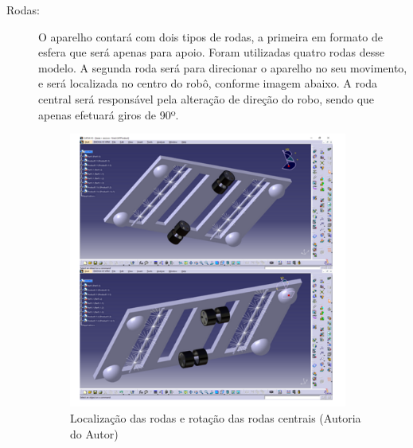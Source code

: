 \begin{description}
\item[Rodas:] O aparelho contará com dois tipos de rodas, a primeira em formato
de esfera que será apenas para apoio. Foram utilizadas quatro rodas desse modelo.
A segunda roda será para direcionar o aparelho no seu movimento, e será localizada
no centro do robô, conforme imagem abaixo. A roda central será responsável pela
alteração de direção do robo, sendo que apenas efetuará giros de  90º.
\par
\begin{figure}[h]
  \centering
  \includegraphics[width=0.9\textwidth]{figures/wheels.png}
  \caption{Localização das rodas e rotação das rodas centrais (\textsf{Autoria do Autor})}
  \label{fig:wheels}
\end{figure}
\FloatBarrier


\end{description}
